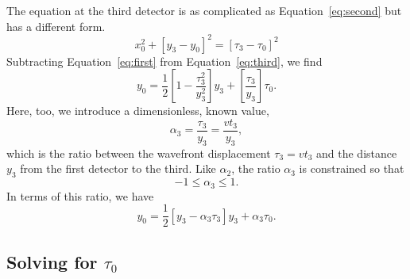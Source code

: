 \documentclass[twocolumn]{article}
\begin{document}
The equation at the third detector is as complicated as
Equation~\ref{eq:second} but has a different form.
\begin{equation}
   x_0^2 + \left[y_3 - y_0\right]^2 = \left[\tau_3 - \tau_0\right]^2
   \label{eq:third}
\end{equation}
Subtracting Equation~\ref{eq:first} from Equation~\ref{eq:third}, we find
\begin{equation}
   y_0 = \frac{1}{2}\left[1 - \frac{\tau_3^2}{y_3^2}\right] y_3 +
         \left[\frac{\tau_3}{y_3}\right] \tau_0.
\end{equation}
Here, too, we introduce a dimensionless, known value,
\begin{equation}
   \alpha_3 = \frac{\tau_3}{y_3} = \frac{v t_3}{y_3},
\end{equation}
which is the ratio between the wavefront displacement $\tau_3 = vt_3$ and the
distance $y_3$ from the first detector to the third.  Like $\alpha_2$, the
ratio $\alpha_3$ is constrained so that
\begin{equation}
   -1 \leq \alpha_3 \leq 1.
\end{equation}
In terms of this ratio, we have
\begin{equation}
   y_0 = \frac{1}{2}\left[y_3 - \alpha_3\tau_3\right] y_3 + \alpha_3\tau_0.
   \label{eq:t-y}
\end{equation}

\subsection{Solving for $\tau_0$}
\end{document}
